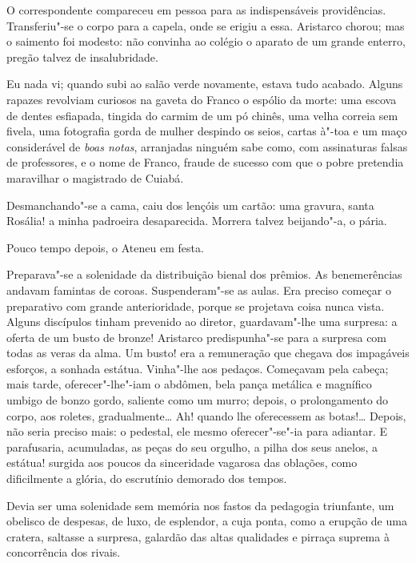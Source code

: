 
O correspondente compareceu em pessoa para
as indispensáveis providências. Transferiu"-se o corpo para a capela,
onde se erigiu a essa. Aristarco chorou; mas o saimento foi modesto:
não convinha ao colégio o aparato de um grande enterro, pregão talvez
de insalubridade. 

Eu nada vi; quando subi ao salão verde novamente,
estava tudo acabado. Alguns rapazes revolviam curiosos na gaveta do
Franco o espólio da morte: uma escova de dentes esfiapada, tingida do
carmim de um pó chinês, uma velha correia sem fivela, uma fotografia
gorda de mulher despindo os seios, cartas à"-toa e um maço
considerável de \textit{boas notas}, arranjadas ninguém sabe como, com
assinaturas falsas de professores, e o nome de Franco, fraude de
sucesso com que o pobre pretendia maravilhar o magistrado de Cuiabá.

Desmanchando"-se a cama, caiu dos lençóis um cartão: uma gravura,
santa Rosália! a minha padroeira desaparecida. Morrera talvez
beijando"-a, o pária. 

Pouco tempo depois, o Ateneu em festa.

Preparava"-se a solenidade da distribuição bienal dos prêmios. As
benemerências andavam famintas de coroas. Suspenderam"-se as aulas.
Era preciso começar o preparativo com grande anterioridade, porque se
projetava coisa nunca vista. Alguns discípulos tinham prevenido ao
diretor, guardavam"-lhe uma surpresa: a oferta de um busto de bronze!
Aristarco predispunha"-se para a surpresa com todas as veras da alma.
Um busto! era a remuneração que chegava dos impagáveis esforços, a
sonhada estátua. Vinha"-lhe aos pedaços. Começavam pela cabeça; mais
tarde, oferecer"-lhe"-iam o abdômen, bela pança metálica e magnífico
umbigo de bonzo gordo, saliente como um murro; depois, o prolongamento
do corpo, aos roletes, gradualmente\ldots{} Ah! quando lhe oferecessem as
botas!\ldots{} Depois, não seria preciso mais: o pedestal, ele mesmo
oferecer"-se"-ia para adiantar. E parafusaria, acumuladas, as peças
do seu orgulho, a pilha dos seus anelos, a estátua! surgida aos poucos
da sinceridade vagarosa das oblações, como dificilmente a glória, do
escrutínio demorado dos tempos. 

Devia ser uma solenidade sem memória
nos fastos da pedagogia triunfante, um obelisco de despesas, de luxo,
de esplendor, a cuja ponta, como a erupção de uma cratera, saltasse a
surpresa, galardão das altas qualidades e pirraça suprema à
concorrência dos rivais. 

